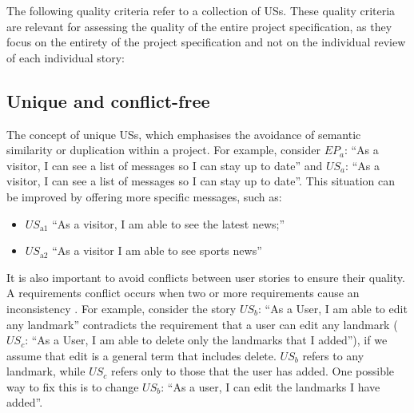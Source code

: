 The following quality criteria refer to a collection of USs. These quality criteria are relevant for assessing the quality of the entire project specification, as they focus on the entirety of the project specification and not on the individual review of each individual story:
\subsection*{\normalsize{Unique and conflict-free}}
The concept of unique USs, which emphasises the avoidance of semantic similarity or duplication within a project. For example, consider $EP_a$: \enquote{As a visitor, I can see a list of messages so I can stay up to date} and $US_a$: \enquote{As a visitor, I can see a list of messages so I can stay up to date}. This situation can be improved by offering more specific messages, such as:
\begin{itemize}
\item $US_{\text{a1}}$ \enquote{As a visitor, I am able to see the latest news;}
\item $US_{\text{a2}}$ \enquote{As a visitor I am able to see sports news}
\end{itemize}
It is also important to avoid conflicts between user stories to ensure their quality. A requirements conflict occurs when two or more requirements cause an inconsistency\cite{paja2013managing} \cite{robinson1989integrating}. For example, consider the story $US_b$: \enquote{As a User, I am able to edit any landmark} contradicts the requirement that a user can edit any landmark ($US_c$: \enquote{As a User, I am able to delete only the landmarks that I added}), if we assume that edit is a general term that includes delete. $US_b$ refers to any landmark, while $US_c$ refers only to those that the user has added. One possible way to fix this is to change $US_b$: \enquote{As a user, I can edit the landmarks I have added}. \cite{lucassen2016improving}

